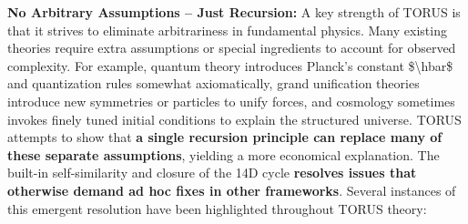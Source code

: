 \documentclass[
]{article}
\begin{document}
{\textbf{No Arbitrary Assumptions -- Just Recursion:} A key strength of
TORUS is that it strives to eliminate arbitrariness in fundamental
physics. Many existing theories require extra assumptions or special
ingredients to account for observed complexity. For example, quantum
theory introduces Planck's constant \$\textbackslash hbar\$ and
quantization rules somewhat axiomatically, grand unification theories
introduce new symmetries or particles to unify forces, and cosmology
sometimes invokes finely tuned initial conditions to explain the
structured universe. TORUS attempts to show that \textbf{a single
recursion principle can replace many of these separate assumptions},
yielding a more economical explanation. The built-in self-similarity and
closure of the 14D cycle \textbf{resolves issues that otherwise demand
ad hoc fixes in other frameworks\hspace{0pt}}. Several instances of this
emergent resolution have been highlighted throughout TORUS theory:

}
\end{document}
